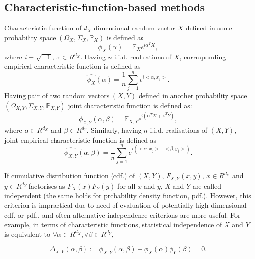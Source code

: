 \documentclass{article}
\begin{document}
\subsection{Characteristic-function-based methods}
\label{section:previous_work_cf}
Characteristic function of $d_{X}$-dimensional random vector $X$ defined in some probability space $(\Omega_{X}, \Sigma_{X}, \mathbb{P}_{X})$ is defined as 
\begin{equation}
    \label{eq:characteristic_function}
    \phi_{X}(\alpha) = \mathbb{E}_{X} e^{i\alpha^{T}X}, 
\end{equation}
where $i=\sqrt{-1}$, $\alpha \in R^{d_{X}}$. Having $n$ i.i.d. realisations of $X$, corresponding empirical characteristic function is defined as
\begin{equation}
    \label{eq:ecf}
  \widehat{\phi_{X}}(\alpha) = \frac{1}{n} \sum_{j=1}^{n} e^{i <\alpha, x_{j}>}.
\end{equation}
Having pair of two random vectors $(X,Y)$ defined in another probability space $(\Omega_{X,Y}, \Sigma_{X,Y}, \mathbb{P}_{X,Y})$  joint characteristic function is defined as:
\begin{equation}
    \label{eq:joint_characteristic_function}
    \phi_{X,Y}(\alpha,\beta) = \mathbb{E}_{X,Y} e^{i(\alpha^{T}X + \beta^{T}Y)},
\end{equation}
where $\alpha \in R^{d_{X}}$ and $\beta \in R^{d_{Y}}$. Similarly, having 
$n$ i.i.d. realisations of $(X,Y)$, joint empirical characteristic function is defined as
\begin{equation}
    \label{eq:joint_ecf}
\widehat{\phi_{X,Y}}(\alpha,\beta) = \frac{1}{n} \sum_{j=1}^{n} e^{i(<\alpha, x_{j}> + <\beta, y_{j}>) }.
\end{equation}

If cumulative distribution function (cdf.) of $(X,Y)$, $F_{X,Y}(x,y)$, $x \in R^{d_{X}}$ and $y \in R^{d_{Y}}$ factorises as $F_{X}(x)F_{Y}(y)$ for all $x$ and $y$, $X$ and $Y$ are called independent (the same holds for probability density function, pdf.). However, this criterion is impractical due to need of evaluation of potentially high-dimensional cdf. or pdf., and often alternative independence criterions are more useful. For example, in terms of characteristic functions, statistical independence  of $X$ and $Y$ is equivalent to $\forall \alpha \in R^{d_X},\forall \beta \in R^{d_Y} $, 

\begin{equation}
\label{eq:kac_theorem}
\Delta_{X,Y}(\alpha, \beta) := \phi_{X,Y}(\alpha,\beta) - \phi_{X}(\alpha) \phi_{Y}(\beta) = 0.
\end{equation}
\end{document}

